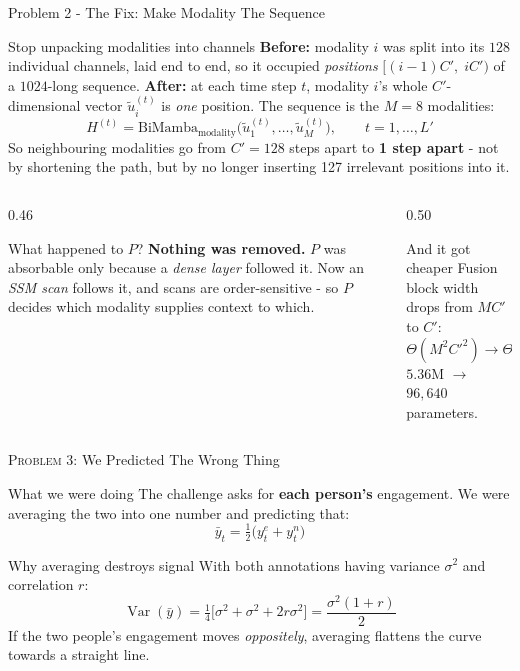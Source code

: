 \documentclass[aspectratio=169]{beamer}
\newcommand{\hl}[1]{\textcolor{coolpurple}{\textbf{#1}}}
\begin{document}
	\begin{frame}{Problem 2 - The Fix: Make Modality The Sequence}
		\begin{block}{Stop unpacking modalities into channels}
			\small
			\textbf{Before:} modality $i$ was split into its $128$ individual channels, laid end to
			end, so it occupied \emph{positions} $[(i{-}1)C',\; iC')$ of a $1024$-long sequence.
			\textbf{After:} at each time step $t$, modality $i$'s whole $C'$-dimensional vector
			$\tilde{u}_i^{(t)}$ is \emph{one} position. The sequence is the $M = 8$ modalities:
			$$ H^{(t)} = \text{BiMamba}_{\text{modality}}\bigl(\tilde{u}_1^{(t)},\dots,\tilde{u}_M^{(t)}\bigr),
			\qquad t = 1,\dots,L' $$
			So neighbouring modalities go from $C' = 128$ steps apart to \hl{1 step apart} - not by
			shortening the path, but by no longer inserting 127 irrelevant positions into it.
		\end{block}
		\begin{columns}[onlytextwidth]
			\begin{column}{0.46\textwidth}
				\begin{block}{What happened to $P$?}
					\small
					\textbf{Nothing was removed.} $P$ was absorbable only because a \emph{dense
					layer} followed it. Now an \emph{SSM scan} follows it, and scans are
					order-sensitive - so $P$ decides which modality supplies context to which.
				\end{block}
			\end{column}
			\begin{column}{0.50\textwidth}
				\begin{block}{And it got cheaper}
					\small
					Fusion block width drops from $MC'$ to $C'$:
					$$ \Theta(M^2C'^2) \to \Theta(C'^2) $$
					$5.36$M $\to$ $96{,}640$ parameters.
				\end{block}
			\end{column}
		\end{columns}
	\end{frame}


	\begin{frame}{\textsc{Problem 3:} We Predicted The Wrong Thing}
		\begin{alertblock}{What we were doing}
			\small
			The challenge asks for \textbf{each person's} engagement. We were averaging the two
			into one number and predicting that:
			$$ \bar{y}_t = \tfrac{1}{2}\bigl(y^{e}_t + y^{n}_t\bigr) $$
		\end{alertblock}
		\begin{block}{Why averaging destroys signal}
			\small
			With both annotations having variance $\sigma^2$ and correlation $r$:
			$$ \operatorname{Var}(\bar{y}) = \tfrac{1}{4}\bigl[\sigma^2 + \sigma^2 + 2r\sigma^2\bigr]
			= \frac{\sigma^2(1+r)}{2} $$
			If the two people's engagement moves \emph{oppositely}, averaging flattens the curve
			towards a straight line.
		\end{block}
	\end{frame}
\end{document}
